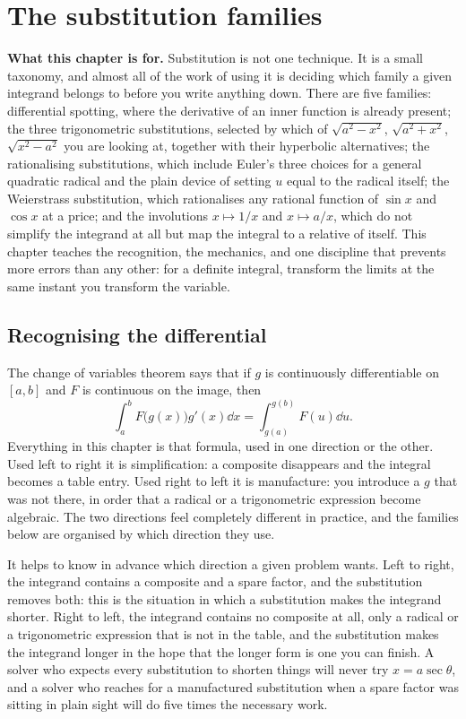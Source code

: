 \chapter{The substitution families}

\begin{orient}
\textbf{What this chapter is for.} Substitution is not one technique. It is a small taxonomy, and almost all of the work of using it is deciding which family a given integrand belongs to before you write anything down. There are five families: differential spotting, where the derivative of an inner function is already present; the three trigonometric substitutions, selected by which of $\sqrt{a^2-x^2}$, $\sqrt{a^2+x^2}$, $\sqrt{x^2-a^2}$ you are looking at, together with their hyperbolic alternatives; the rationalising substitutions, which include Euler's three choices for a general quadratic radical and the plain device of setting $u$ equal to the radical itself; the Weierstrass substitution, which rationalises any rational function of $\sin x$ and $\cos x$ at a price; and the involutions $x\mapsto1/x$ and $x\mapsto a/x$, which do not simplify the integrand at all but map the integral to a relative of itself. This chapter teaches the recognition, the mechanics, and one discipline that prevents more errors than any other: for a definite integral, transform the limits at the same instant you transform the variable.
\end{orient}

\section{Recognising the differential}

The change of variables theorem says that if $g$ is continuously differentiable on $[a,b]$ and $F$ is continuous on the image, then
\[
\int_a^b F\bigl(g(x)\bigr)g'(x)\dd x=\int_{g(a)}^{g(b)}F(u)\dd u .
\]
Everything in this chapter is that formula, used in one direction or the other. Used left to right it is simplification: a composite disappears and the integral becomes a table entry. Used right to left it is manufacture: you introduce a $g$ that was not there, in order that a radical or a trigonometric expression become algebraic. The two directions feel completely different in practice, and the families below are organised by which direction they use.

It helps to know in advance which direction a given problem wants. Left to right, the integrand contains a composite and a spare factor, and the substitution removes both: this is the situation in which a substitution makes the integrand shorter. Right to left, the integrand contains no composite at all, only a radical or a trigonometric expression that is not in the table, and the substitution makes the integrand longer in the hope that the longer form is one you can finish. A solver who expects every substitution to shorten things will never try $x=a\sec\theta$, and a solver who reaches for a manufactured substitution when a spare factor was sitting in plain sight will do five times the necessary work.

